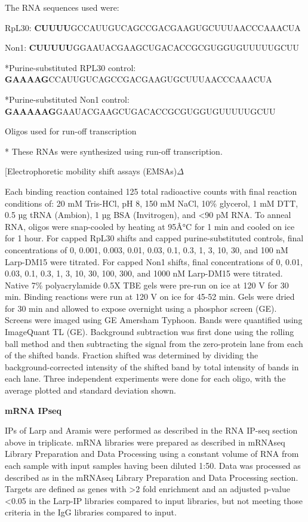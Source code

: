 \documentclass[12pt,oneside]{reedthesis}
\begin{document}
The RNA sequences used were:

RpL30: \textbf{CUUUU}GCCAUUGUCAGCCGACGAAGUGCUUUAACCCAAACUA

Non1: \textbf{CUUUUU}GGAAUACGAAGCUGACACCGCGUGGUGUUUUUGCUU

*Purine-substituted RPL30 control:
\textbf{GAAAAG}CCAUUGUCAGCCGACGAAGUGCUUUAACCCAAACUA

*Purine-substituted Non1 control:
\textbf{GAAAAAG}GAAUACGAAGCUGACACCGCGUGGUGUUUUUGCUU

Oligos used for run-off transcription

* These RNAs were synthesized using run-off transcription.

{[}Electrophoretic mobility shift assays (EMSAs)\(\Delta\)

Each binding reaction contained 125 total radioactive counts with final
reaction conditions of: 20 mM Tris-HCl, pH 8, 150 mM NaCl, 10\% glycerol,
1 mM DTT, 0.5 µg tRNA (Ambion), 1 µg BSA (Invitrogen), and \textless90 pM RNA.
To anneal RNA, oligos were snap-cooled by heating at 95Â°C for 1 min and
cooled on ice for 1 hour. For capped RpL30 shifts and capped
purine-substituted controls, final concentrations of 0, 0.001, 0.003,
0.01, 0.03, 0.1, 0.3, 1, 3, 10, 30, and 100 nM Larp-DM15 were titrated.
For capped Non1 shifts, final concentrations of 0, 0.01, 0.03, 0.1, 0.3,
1, 3, 10, 30, 100, 300, and 1000 nM Larp-DM15 were titrated. Native 7\%
polyacrylamide 0.5X TBE gels were pre-run on ice at 120 V for 30 min.
Binding reactions were run at 120 V on ice for 45-52 min. Gels were
dried for 30 min and allowed to expose overnight using a phosphor screen
(GE). Screens were imaged using GE Amersham Typhoon. Bands were
quantified using ImageQuant TL (GE). Background subtraction was first
done using the rolling ball method and then subtracting the signal from
the zero-protein lane from each of the shifted bands. Fraction shifted
was determined by dividing the background-corrected intensity of the
shifted band by total intensity of bands in each lane. Three independent
experiments were done for each oligo, with the average plotted and
standard deviation shown.

\textbf{mRNA IPseq}

IPs of Larp and Aramis were performed as described in the RNA IP-seq
section above in triplicate. mRNA libraries were prepared as described
in mRNAseq Library Preparation and Data Processing using a constant
volume of RNA from each sample with input samples having been diluted
1:50. Data was processed as described as in the mRNAseq Library
Preparation and Data Processing section. Targets are defined as genes
with \textgreater2 fold enrichment and an adjusted p-value \textless0.05 in the Larp-IP
libraries compared to input libraries, but not meeting those criteria in
the IgG libraries compared to input.
\end{document}
